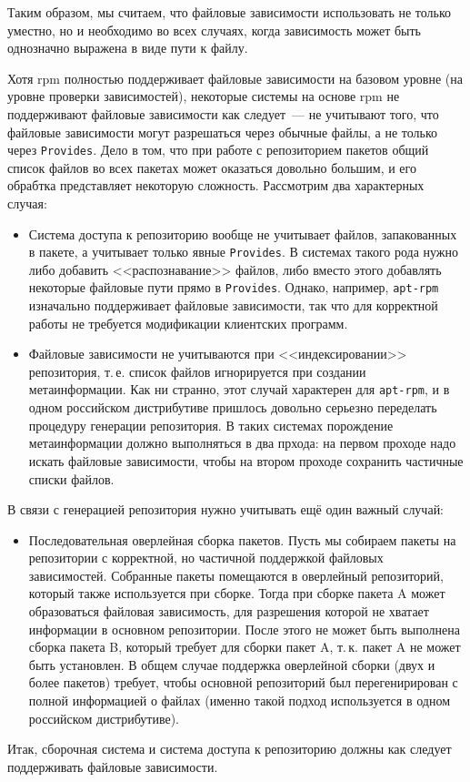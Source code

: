 \documentclass[russian,a4paper,12pt,titlepage]{article}
\begin{document}
Таким образом, мы считаем, что файловые зависимости использовать не только уместно, но и необходимо во всех случаях,
когда зависимость может быть однозначно выражена в виде пути к файлу.

Хотя rpm полностью поддерживает файловые зависимости на базовом уровне (на уровне проверки зависимостей),
некоторые системы на основе rpm не поддерживают файловые зависимости как следует~--- не учитывают того,
что файловые зависимости могут разрешаться через обычные файлы, а не только через \verb|Provides|.
Дело в том, что при работе с репозиторием пакетов общий список файлов во всех пакетах может оказаться
довольно большим, и его обрабтка представляет некоторую сложность.  Рассмотрим два характерных случая:
\begin{itemize}
\item Система доступа к репозиторию вообще не учитывает файлов, запакованных в пакете, а учитывает только явные \verb|Provides|.
В системах такого рода нужно либо добавить <<распознавание>> файлов, либо вместо этого добавлять некоторые файловые пути прямо
в \verb|Provides|.  Однако, например, \verb|apt-rpm| изначально поддерживает файловые зависимости, так что для корректной работы
не требуется модификации клиентских программ.
\item Файловые зависимости не учитываются при <<индексировании>> репозитория, т.\,е. список файлов игнорируется при создании
метаинформации.  Как ни странно, этот случай характерен для \verb|apt-rpm|, и в одном российском дистрибутиве пришлось довольно
серьезно переделать процедуру генерации репозитория.  В таких системах порождение метаинформации должно выполняться в два
прхода: на первом проходе надо искать файловые зависимости, чтобы на втором проходе сохранить частичные списки файлов.
\end{itemize}
В связи с генерацией репозитория нужно учитывать ещё один важный случай:
\begin{itemize}
\item Последовательная оверлейная сборка пакетов.  Пусть мы собираем пакеты на репозитории с корректной, но частичной
поддержкой файловых зависимостей.  Собранные пакеты помещаются в оверлейный репозиторий, который также используется
при сборке.  Тогда при сборке пакета A может образоваться файловая зависимость, для разрешения которой не хватает информации
в основном репозитории.  После этого не может быть выполнена сборка пакета B, который требует для сборки пакет A,
т.\,к. пакет A не может быть установлен.  В общем случае поддержка оверлейной сборки (двух и более пакетов) требует,
чтобы основной репозиторий был перегенирирован с полной информацией о файлах (именно такой подход используется в одном
российском дистрибутиве).
\end{itemize}
Итак, сборочная система и система доступа к репозиторию должны как следует поддерживать файловые зависимости.
\end{document}
